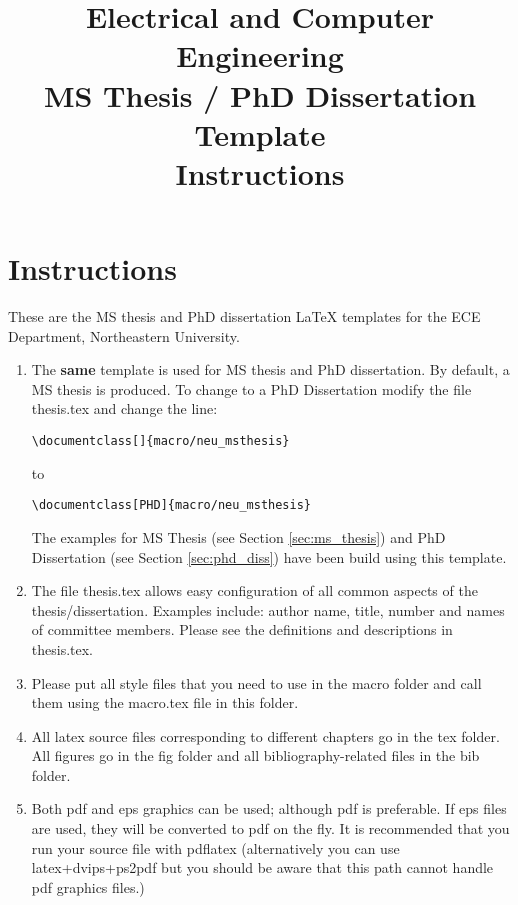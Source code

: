 \documentclass{article}
\title{Electrical and Computer Engineering\\MS Thesis / PhD Dissertation Template\\Instructions}
\begin{document}
\maketitle

\tableofcontents


\section{Instructions}


These are the MS thesis and PhD dissertation LaTeX templates for
the ECE Department, Northeastern University.

\begin{enumerate}
\item The \textbf{same} template is used for MS thesis and PhD dissertation. By default, a MS thesis is produced. To change to a PhD Dissertation modify the file thesis.tex and change the line:
\vspace{-8pt}
\begin{verbatim}
\documentclass[]{macro/neu_msthesis}
\end{verbatim}
\vspace{-8pt}
to
\vspace{-8pt}
\begin{verbatim}
\documentclass[PHD]{macro/neu_msthesis}
\end{verbatim}
\vspace{-8pt}

The examples for MS Thesis (see Section \ref{sec:ms_thesis}) and PhD Dissertation (see Section \ref{sec:phd_diss}) have been build using this template.

\item The file thesis.tex allows easy configuration of all common aspects of the thesis/dissertation. Examples include: author name, title, number and names of committee members. Please see the definitions and descriptions in thesis.tex.

\item Please put all style files that you need to use in the macro
folder and call them using the macro.tex file in this folder.

\item All latex source files corresponding to different chapters go in
the tex folder. All figures go in the fig folder and all
bibliography-related files in the bib folder.

\item Both pdf and eps graphics can be used; although pdf is
preferable. If eps files are used, they will be converted to pdf on
the fly. It is recommended that you run your source file with
pdflatex (alternatively you can use latex+dvips+ps2pdf but you
should be aware that this path cannot handle pdf graphics files.)


\end{enumerate}
\end{document}
